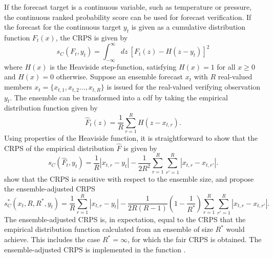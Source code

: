 \documentclass[article]{jss}
\begin{document}
If the forecast target is a continuous variable, such as temperature or pressure, the continuous ranked probability score \citep{matheson1976scoring} can be used for forecast verification.
If the forecast for the continuous target $y_t$ is given as a cumulative distribution function $F_t(x)$, the CRPS is given by 
%
\begin{equation}
s_{C}(F_t, y_t) = \int_{-\infty}^\infty dz\ \left[F_t(z) - H(z-y_t)\right]^2
\end{equation}
%
where $H(x)$ is the Heaviside step-function, satisfying $H(x)=1$ for all $x\ge 0$ and $H(x)=0$ otherwise.
Suppose an ensemble forecast $x_t$ with $R$ real-valued members $x_t = \{x_{t,1}, x_{t,2} \dots, x_{t,R}\}$ is issued for the real-valued verifying observation $y_t$.
The ensemble can be transformed into a cdf by taking the empirical distribution function given by 
%
\begin{equation}
\hat{F}_t(z) = \frac{1}{R} \sum_{r=1}^{R} H(z - x_{t,r}).
\end{equation}
%
Using properties of the Heaviside function, it is straightforward to show that the CRPS of the empirical distribution $\hat{F}$ is given by
%
\begin{equation}
s_{C}(\hat{F}_t, y_t) = \frac{1}{R}|x_{t,r}-y_t| - \frac{1}{2R^2} \sum_{r=1}^R \sum_{r'=1}^R |x_{t,r}-x_{t,r'}|.
\end{equation}
%
\citet{fricker2013three} show that the CRPS is sensitive with respect to the ensemble size, and propose the ensemble-adjusted CRPS
%
\begin{equation}
s_{C}^*(x_t, R, R^*, y_t) = \frac{1}{R}\sum_{r=1}^R |x_{t,r} - y_t| - \frac{1}{2R(R-1)}\left(1-\frac{1}{R^*}\right) \sum_{r=1}^R\sum_{r'=1}^R |x_{t,r}-x_{t,r'}|.
\end{equation}
%
The ensemble-adjusted CRPS is, in expectation, equal to the CRPS that the empirical distribution function calculated from an ensemble of size $R^*$ would achieve.
This includes the case $R^*=\infty$, for which the fair CRPS is obtained.
The ensemble-adjusted CRPS is implemented in the  function .
\end{document}

